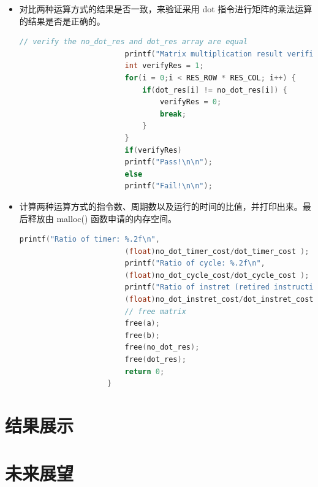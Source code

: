\documentclass[a4paper, 14pt, oneside]{book} %
\numberwithin{equation}{subsection}
\begin{document}
\begin{enumerate}
\begin{itemize}
\begin{lstlisting}[language={C++}]
						printf("dot time cost: %.2fms\n", (float)dot_timer_cost/RTC_FREQ*1000);
						printf("dot_cycle: %u\n", dot_cycle_cost);
						printf("dot_instret: %u\n", dot_instret_cost);
						printf("dot CPI: %.2f\n\n", (float)dot_cycle_cost/dot_instret_cost);	
					\end{lstlisting}
					\item 对比两种运算方式的结果是否一致，来验证采用 dot 指令进行矩阵的乘法运算的结果是否是正确的。
					\begin{lstlisting}[language={C++}]
						// verify the no_dot_res and dot_res array are equal
						printf("Matrix multiplication result verification: \n");
						int verifyRes = 1;
						for(i = 0;i < RES_ROW * RES_COL; i++) {
							if(dot_res[i] != no_dot_res[i]) {
								verifyRes = 0;
								break;
							}
						}
						if(verifyRes)
						printf("Pass!\n\n");
						else
						printf("Fail!\n\n");	
					\end{lstlisting}
					\item 计算两种运算方式的指令数、周期数以及运行的时间的比值，并打印出来。最后释放由 malloc() 函数申请的内存空间。
					\begin{lstlisting}[language={C++}]
						printf("Ratio of timer: %.2f\n",
						(float)no_dot_timer_cost/dot_timer_cost );
						printf("Ratio of cycle: %.2f\n",
						(float)no_dot_cycle_cost/dot_cycle_cost );
						printf("Ratio of instret (retired instruction): %.2f\n",
						(float)no_dot_instret_cost/dot_instret_cost );	
						// free matrix
						free(a);
						free(b);
						free(no_dot_res);
						free(dot_res);
						return 0;
					}
				\end{lstlisting}
				
			\end{itemize}
		\end{enumerate}	
	
		\section{结果展示}	
		
		
		\section{未来展望}
\end{document}
